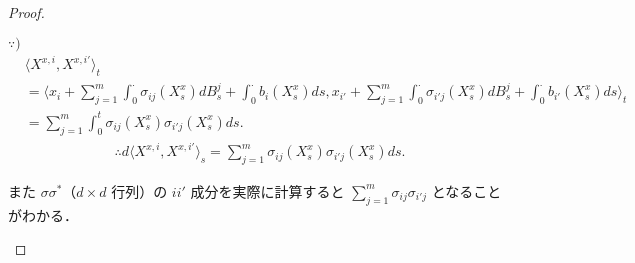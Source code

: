 \documentclass{jsarticle}
\begin{document}
\begin{proof}
\begin{enumerate}[label=(\arabic*)]
        \begin{screen}
            $\because)$
            \begin{align}
                &\langle X^{x, i}, X^{x, i'}\rangle_{t} \\
                &= \langle x_i
                + \sum_{j=1}^{m}\int_{0}^{\cdot}\sigma_{ij}(X_{s}^{x})dB_{s}^{j}
                + \int_{0}^{\cdot}b_{i}(X_{s}^{x})ds, 
                x_{i'}
                + \sum_{j=1}^{m}\int_{0}^{\cdot}\sigma_{i'j}(X_{s}^{x})dB_{s}^{j}
                + \int_{0}^{\cdot}b_{i'}(X_{s}^{x})ds\rangle_{t} \\
                &= \sum_{j=1}^{m}\int_{0}^{t}\sigma_{ij}(X_{s}^{x})\sigma_{i'j}(X_{s}^{x})ds.
            \end{align}
            \begin{align}
                \therefore d\langle X^{x, i}, X^{x, i'}\rangle_{s}
                = \sum_{j=1}^{m}\sigma_{ij}(X_{s}^{x})\sigma_{i'j}(X_{s}^{x})ds.
            \end{align}

            また $\sigma\sigma^{\ast}$（$d\times d$ 行列）の $ii'$ 成分を実際に計算すると $\sum_{j=1}^{m}\sigma_{ij}\sigma_{i'j}$ となることがわかる．
        \end{screen}
        

\end{enumerate}
\end{proof}
\end{document}
